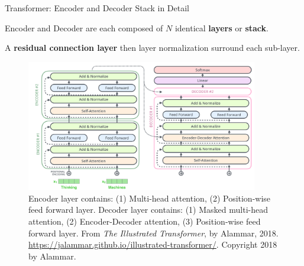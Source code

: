 \begin{frame}{Transformer: Encoder and Decoder Stack in Detail}

    \begin{itemizeSpaced}{2pt}
        \item Encoder and Decoder are each composed of $N$ identical \textbf{layers} or \textbf{stack}.
    
        \item A \textbf{residual connection layer} then layer normalization surround each sub-layer.  
    
    
    \end{itemizeSpaced}
    
    
    \begin{figure}[h]
    \vspace{-10pt}
    \centering
    \includegraphics[width=0.9\textwidth]{imgs/encoderDecoderLayersDetailed.png}
    \vspace{-10pt}
    \caption{\linespread{0.4} \footnotesize Encoder layer contains: (1) Multi-head attention, (2) Position-wise feed forward layer. Decoder layer contains: (1) Masked multi-head attention, (2) Encoder-Decoder attention, (3) Position-wise feed forward layer. From \emph{The Illustrated Transformer}, by Alammar, 2018. \url{https://jalammar.github.io/illustrated-transformer/}. Copyright 2018 by Alammar. }
    \vspace{-5pt}
    \label{fig:encDecLayersDetailed}
    \end{figure}
    
\end{frame}





